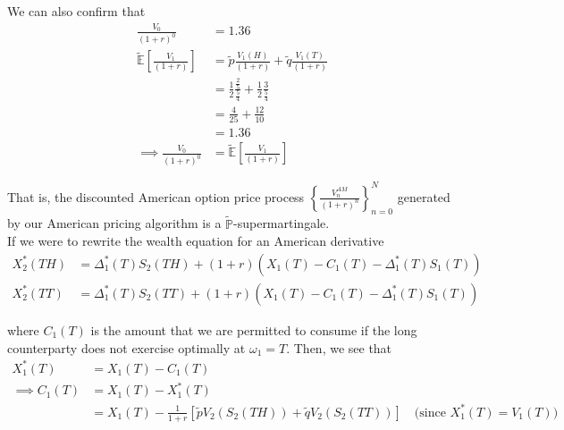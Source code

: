 \documentclass[12pt]{article}
\newlength\tindent
\renewcommand{\indent}{\hspace*{\tindent}}
\renewcommand{\P}{\mathbb P}
\newcommand{\E}{\mathbb E}
\begin{document}
We can also confirm that
\begin{align*}
	\frac{V_0}{(1 + r)^0} &= 1.36 \\
	\tilde{\E}\left[ \frac{V_1}{(1 + r)} \right] &= \tilde{p}\frac{V_1(H)}{(1 + r)} + \tilde{q}\frac{V_1(T)}{(1 + r)} \\
	&= \frac{1}{2}\frac{ \frac{2}{5} }{\frac{5}{4}} + \frac{1}{2}\frac{3}{\frac{5}{4}} \\
	&= \frac{4}{25} + \frac{12}{10} \\
	&= 1.36 \\
	\implies \frac{V_0}{(1 + r)^0} &= \tilde{\E}\left[ \frac{V_1}{(1 + r)} \right]
\end{align*}

\indent That is, the discounted American option price process $\left\{ \frac{V^{AM}_n}{(1 + r)^n} \right\}^N_{n = 0}$ generated by our American pricing algorithm is a $\tilde{\P}$-supermartingale. \\

If we were to rewrite the wealth equation for an American derivative
\begin{align*}
	X^*_2(TH) &= \Delta^*_1(T)S_2(TH) + (1 + r)(X_1(T) - C_1(T) - \Delta^*_1(T)S_1(T)) \\
	X^*_2(TT) &= \Delta^*_1(T)S_2(TT) + (1 + r)(X_1(T) - C_1(T) - \Delta^*_1(T)S_1(T))
\end{align*}

where $C_1(T)$ is the amount that we are permitted to consume if the long counterparty does not exercise optimally at $\omega_1 = T$. Then, we see that
\begin{align*}
	X_1^*(T) &= X_1(T) - C_1(T) \\
	\implies C_1(T) &= X_1(T) - X^*_1(T) \\
	&= X_1(T) - \frac{1}{1 + r}\left[\tilde{p}V_2(S_2(TH)) + \tilde{q}V_2(S_2(TT)) \right] \quad \text{(since $X^*_1(T) = V_1(T)$)}
\end{align*}
\end{document}
